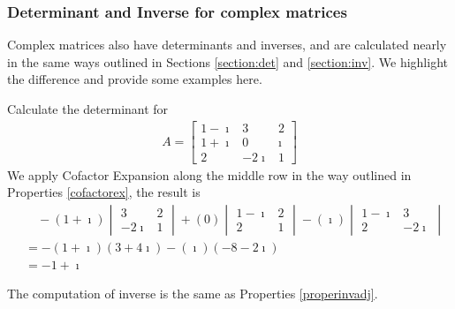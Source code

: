 \subsubsection{Determinant and Inverse for complex matrices}
Complex matrices also have determinants and inverses, and are calculated nearly in the same ways outlined in Sections \ref{section:det} and \ref{section:inv}. We highlight the difference and provide some examples here.

\begin{exmp}
Calculate the determinant for
\begin{align*}
A = 
\begin{bmatrix}
1-\imath & 3 & 2 \\
1+\imath & 0 & \imath \\
2 & -2\imath & 1
\end{bmatrix}
\end{align*}
We apply Cofactor Expansion along the middle row in the way outlined in Properties \ref{cofactorex}, the result is
\begin{align*}
&\quad -(1+\imath)
\begin{vmatrix}
3 & 2 \\
-2\imath & 1
\end{vmatrix}
+ (0)
\begin{vmatrix}
1-\imath & 2 \\
2 & 1
\end{vmatrix}
- (\imath)
\begin{vmatrix}
1-\imath & 3 \\
2 & -2\imath
\end{vmatrix} \\
&= -(1+\imath)(3+4\imath) - (\imath)(-8-2\imath) \\
&= -1 + \imath
\end{align*}
\end{exmp}
The computation of inverse is the same as Properties \ref{properinvadj}.
